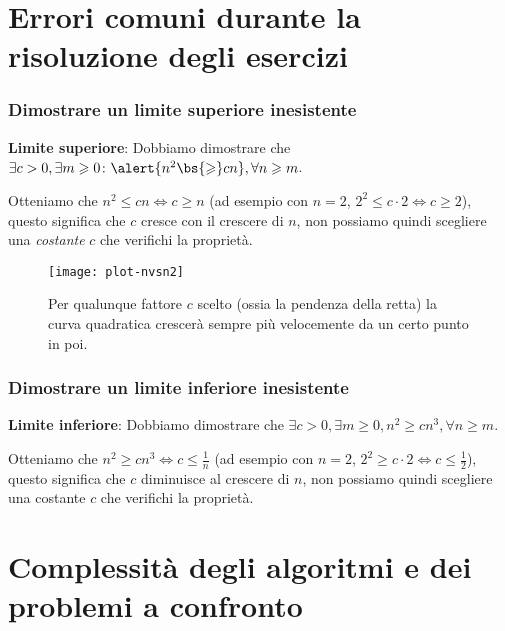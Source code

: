 \clearpage
\section*{Errori comuni durante la risoluzione degli esercizi}

\subsubsection*{Dimostrare un limite superiore inesistente}


\textbf{Limite superiore}: Dobbiamo dimostrare che \( \exists c > 0, \exists m \geqslant 0 \colon \alert{n^2 \bs{\geqslant} cn}, \forall n \geqslant m \).

Otteniamo che \(n^2 \leqslant cn \Leftrightarrow c \geqslant n\) (ad esempio con \(n=2\), \(2^2 \leqslant c \cdot 2 \Leftrightarrow c \geqslant 2\)), questo significa che \(c\) cresce con il crescere di \(n\), non possiamo quindi scegliere una \emph{costante} \(c\) che verifichi la proprietà.

\begin{figure}[H]\centering
	\texttt{[image: plot-nvsn2]}
	\caption[]{Per qualunque fattore \(c\) scelto (ossia la pendenza della retta) la curva quadratica crescerà sempre più velocemente da un certo punto in poi.}
	\label{fig:plot-nvsn2}
\end{figure}

\subsubsection*{Dimostrare un limite inferiore inesistente}


\textbf{Limite inferiore}: Dobbiamo dimostrare che \(\exists c > 0, \exists m \geqslant 0, n^2 \geqslant cn^3, \forall n \geqslant m\).

Otteniamo che \(n^2 \geqslant cn^3 \Leftrightarrow c \leqslant \frac{1}{n}\) (ad esempio con \(n=2\), \(2^2 \geqslant c \cdot 2 \Leftrightarrow c \leqslant \frac{1}{2}\)), questo significa che \(c\) diminuisce al crescere di \(n\), non possiamo quindi scegliere una costante \(c\) che verifichi la proprietà.

\clearpage
\section{Complessità degli algoritmi e dei problemi a confronto}

